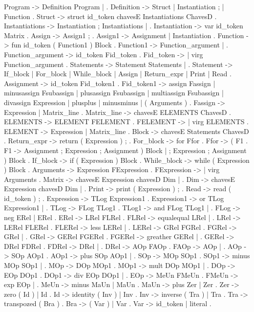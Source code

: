 Program -> Definition Program | .
Definition -> Struct | Instantiation ; | Function .
Struct -> struct id_token chavesE Instantiations ChavesD .
Instantiations -> Instantiation ; Instantiations | .
Instantiation -> var id_token Matrix .
Assign -> Assign1 ; .
Assign1 -> Assignment | Instantiation .
Function -> fun id_token ( Function1 ) Block .
Function1 -> Function_argument | .
Function_argument -> id_token Fid_token .
Fid_token -> | virg Function_argument .
Statements -> Statement Statements | .
Statement -> If_block | For_block | While_block | Assign | Return_expr | Print | Read .
Assignment -> id_token Fid_token1 .
Fid_token1 -> assign Fassign | minusassign Fsubassign | plusassign Fsubassign | multiassign Fsubassign | divassign Expression | plusplus | minusminus | ( Arguments ) .
Fassign -> Expression | Matrix_line .
Matrix_line -> chavesE ELEMENTS ChavesD .
ELEMENTS -> ELEMENT FELEMENT .
FELEMENT -> | virg ELEMENTS .
ELEMENT -> Expression | Matrix_line .
Block -> chavesE Statements ChavesD .
Return_expr -> return ( Expression ) ; .
For_block -> for Ffor .
Ffor -> ( F1 .
F1 -> Assignment ; Expression ; Assignment ) Block | ; Expression ; Assignment ) Block .
If_block -> if ( Expression ) Block .
While_block -> while ( Expression ) Block .
Arguments -> Expression FExpression .
FExpression -> | virg Arguments .
Matrix -> chavesE Expression chavesD Dim | .
Dim -> chavesE Expression chavesD Dim | .
Print -> print ( Expression ) ; .
Read -> read ( id_token ) ; .
Expression -> TLog Expression1 .
Expression1 -> or TLog Expression1 | .
TLog -> FLog TLog1 .
TLog1 -> and FLog TLog1 | .
FLog -> neg ERel | ERel .
ERel -> LRel FLRel .
FLRel -> equalequal LRel | .
LRel -> LERel FLERel .
FLERel -> less LERel | .
LERel -> GRel FGRel .
FGRel -> \leq GRel | .
GRel -> GERel FGERel .
FGERel -> greather GERel | .
GERel -> DRel FDRel .
FDRel -> \geq DRel | .
DRel -> AOp FAOp .
FAOp -> \neq AOp | .
AOp -> SOp AOp1 .
AOp1 -> plus SOp AOp1 | .
SOp -> MOp SOp1 .
SOp1 -> minus MOp SOp1 | .
MOp -> DOp MOp1 .
MOp1 -> mult DOp MOp1 | .
DOp -> EOp DOp1 .
DOp1 -> div EOp DOp1 | .
EOp -> MeUn FMeUn .
FMeUn -> exp EOp | .
MeUn -> minus MaUn | MaUn .
MaUn -> plus Zer | Zer .
Zer -> zero ( Id ) | Id .
Id -> identity ( Inv ) | Inv .
Inv -> inverse ( Tra ) | Tra .
Tra -> transpozed ( Bra ) .
Bra -> ( Var ) | Var .
Var -> id_token | literal .